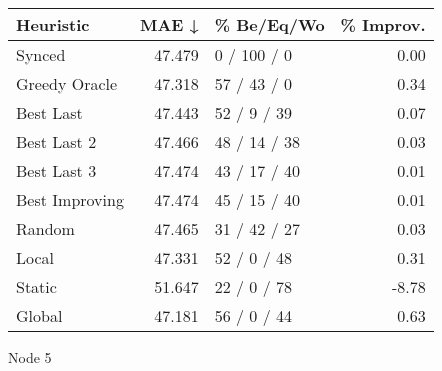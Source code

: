 \begin{tabular}{lrlr}
\toprule
\textbf{Heuristic} & \textbf{MAE ↓} & \textbf{\% Be/Eq/Wo} & \textbf{\% Improv.} \\
\midrule
            Synced &         47.479 &          0 / 100 / 0 &                0.00 \\
     Greedy Oracle &         47.318 &          57 / 43 / 0 &                0.34 \\
         Best Last &         47.443 &          52 / 9 / 39 &                0.07 \\
       Best Last 2 &         47.466 &         48 / 14 / 38 &                0.03 \\
       Best Last 3 &         47.474 &         43 / 17 / 40 &                0.01 \\
    Best Improving &         47.474 &         45 / 15 / 40 &                0.01 \\
            Random &         47.465 &         31 / 42 / 27 &                0.03 \\
             Local &         47.331 &          52 / 0 / 48 &                0.31 \\
            Static &         51.647 &          22 / 0 / 78 &               -8.78 \\
            Global &         47.181 &          56 / 0 / 44 &                0.63 \\
\bottomrule
\end{tabular}
\caption{Node 5}
\label{tab:iid_lr01_le1_bs4_5}
